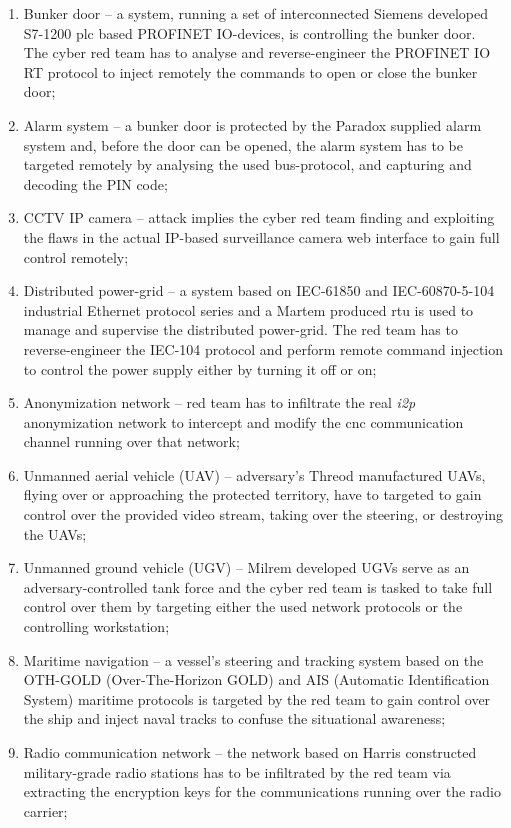\begin{enumerate}
    \item Bunker door -- a system, running a set of interconnected Siemens developed S7-1200 \gls{plc} based PROFINET IO-devices, is controlling the bunker door. The cyber red team has to analyse and reverse-engineer the PROFINET IO RT protocol to inject remotely the commands to open or close the bunker door;
    \item Alarm system -- a bunker door is protected by the Paradox supplied alarm system and, before the door can be opened, the alarm system has to be targeted remotely by analysing the used bus-protocol, and capturing and decoding the PIN code;
    \item CCTV IP camera -- attack implies the cyber red team finding and exploiting the flaws in the actual IP-based surveillance camera web interface to gain full control remotely;
    \item Distributed power-grid -- a system based on IEC-61850 and IEC-60870-5-104 industrial Ethernet protocol series and a Martem produced \gls{rtu} is used to manage and supervise the distributed power-grid. The red team has to reverse-engineer the IEC-104 protocol and perform remote command injection to control the power supply either by turning it off or on;
    \item Anonymization network -- red team has to infiltrate the real \textit{i2p} anonymization network to intercept and modify the \gls{cnc} communication channel running over that network;
    \item Unmanned aerial vehicle (UAV) -- adversary's Threod manufactured UAVs, flying over or approaching the protected territory, have to targeted to gain control over the provided video stream, taking over the steering, or destroying the UAVs;
    \item Unmanned ground vehicle (UGV) -- Milrem developed UGVs serve as an adversary-controlled tank force and the cyber red team is tasked to take full control over them by targeting either the used network protocols or the controlling workstation;
    \item Maritime navigation -- a vessel's steering and tracking system based on the OTH-GOLD (Over-The-Horizon GOLD) and AIS (Automatic Identification System) maritime protocols is targeted by the red team to gain control over the ship and inject naval tracks to confuse the situational awareness;
    \item Radio communication network -- the network based on Harris constructed military-grade radio stations has to be infiltrated by the red team via extracting the encryption keys for the communications running over the radio carrier;

\end{enumerate}
